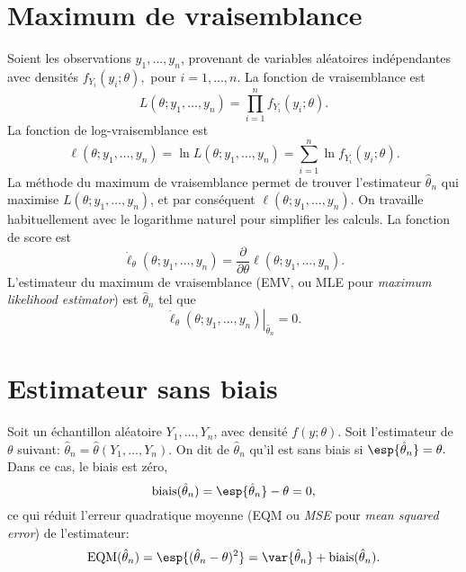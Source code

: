 \section{Maximum de vraisemblance}

Soient les observations $y_1,\ldots,y_n$, provenant de variables aléatoires indépendantes avec densités $f_{Y_i}(y_i;\theta),$ pour $i=1,\ldots,n$. La fonction de vraisemblance est 
$$
L(\theta;y_1,\ldots,y_n)=\prod_{i=1}^{n}f_{Y_i}(y_i;\theta).
$$ 
La fonction de log-vraisemblance est 
$$
\ell(\theta;y_1,\ldots,y_n)=\ln L(\theta;y_1,\ldots,y_n)=\sum_{i=1}^{n}\ln f_{Y_i}(y_i;\theta).
$$ 
La méthode du maximum de vraisemblance permet de trouver l'estimateur $\hat{\theta}_n$ qui maximise $L(\theta;y_1,\ldots,y_n)$, et par conséquent $\ell(\theta;y_1,\ldots,y_n)$. On travaille habituellement avec le logarithme naturel pour simplifier les calculs. La fonction de score est 
$$
\dot{\ell}_{\theta}(\theta;y_1,\ldots,y_n)=\frac{\partial}{\partial \theta}\ell(\theta;y_1,\ldots,y_n).
$$ 
L'estimateur du maximum de vraisemblance (EMV, ou MLE pour \emph{maximum likelihood estimator}) est $\hat{\theta}_n$ tel que 
$$
\left.\dot{\ell}_{\theta}(\theta;y_1,...,y_n)\right|_{\hat{\theta}_n}=0.
$$ 


\section{Estimateur sans biais}

Soit un échantillon aléatoire $Y_1,\ldots,Y_n$, avec densité $f(y;\theta)$. Soit l'estimateur de $\theta$ suivant: $\hat{\theta}_n=\hat{\theta}(Y_1,...,Y_n)$. On dit de $\hat{\theta}_n$ qu'il est sans biais si $\esp{\hat{\theta}_n}=\theta.$ Dans ce cas, le biais est zéro, 
$$
\mbox{biais}(\hat{\theta}_n)=\esp{\hat{\theta}_n}-\theta=0,
$$ 
ce qui réduit l'erreur quadratique moyenne (EQM ou \emph{MSE} pour \emph{mean squared error}) de l'estimateur: 
$$
\mbox{EQM}(\hat{\theta}_n)=\esp{(\hat{\theta}_n-\theta)^2}=\var{\hat{\theta}_n}+\mbox{biais}(\hat{\theta}_n).
$$


\newpage


\newpage



